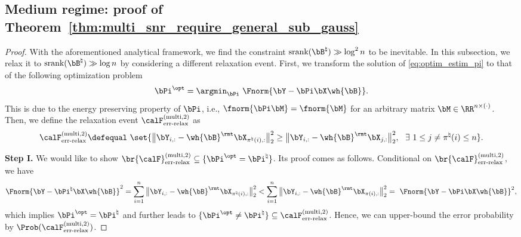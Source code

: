 \documentclass[11pt]{article}
\def \bPitrue {\bPi^{\natural}}
\def \bBtrue {\bB^{\natural}}
\def \bPiopt {\bPi^{\opt}}
\def\srank#1{\textup{srank}(#1)}
\begin{document}
\subsection{Medium regime: proof of Theorem~\ref{thm:multi_snr_require_general_sub_gauss}}

\begin{proof}
With the aforementioned analytical framework, we find the
constraint $\srank{\bBtrue} \gg \log^2 n$ to be inevitable.
In this subsection, we relax it to $\srank{\bBtrue} \gg \log n$ by
considering a different relaxation event.
First, we transform the solution of \eqref{eq:optim_estim_pi} to
that of the following optimization problem
\[
\bPiopt = \argmin_{\bPi}~\Fnorm{\bY - \bPi\bX \wh{\bB} }.
\]
This is due to the energy preserving property
of $\bPi$, i.e., $\fnorm{\bPi \bM} = \fnorm{\bM}$ for
an arbitrary matrix $\bM \in \RR^{n\times (\cdot)}$.
Then, we define the relaxation event $\calF_{\textup{err-relax}}^{(\textup{multi}, 2)}$ as
\[
\calF_{\textup{err-relax}}^{(\textup{multi}, 2)} \defequal \
\set{\big\|\bY_{i, :} - \wh{\bB}^{\rmt}\bX_{\pi^{\natural}(i), :} \big\|_{2}^2 \geq \big\|\bY_{i, :} - \wh{\bB}^{\rmt}\bX_{j, :} \big\|_{2}^2,~~\exists~1\leq j\neq \pi^{\natural}(i) \leq n}.
\]

\noindent
\textbf{Step I.}
We would like to show $\br{\calF}_{\textup{err-relax}}^{(\textup{multi}, 2)} \subseteq \{\bPiopt = \bPitrue\}$. Its proof comes as follows.
Conditional on $\br{\calF}_{\textup{err-relax}}^{(\textup{multi}, 2)}$, we have
\[
\Fnorm{\bY - \bPitrue\bX\wh{\bB} }^2 =
\sum_{i=1}^n \big \|\bY_{i, :} - \wh{\bB}^{\rmt}\bX_{\pi^{\natural}(i), :}\big \|_{2}^2
< \sum_{i=1}^n \big \|\bY_{i, :} -\wh{\bB}^{\rmt} \bX_{\pi(i), :}\big \|_{2}^2 = \
\Fnorm{\bY - \bPi\bX\wh{\bB} }^2,
\]
which implies $\bPiopt = \bPitrue$ and further leads to
$\{\bPiopt \neq \bPitrue\} \subseteq \calF_{\textup{err-relax}}^{(\textup{multi}, 2)}$.
Hence, we can upper-bound the error probability
by $\Prob(\calF_{\textup{err-relax}}^{(\textup{multi}, 2)})$.


\end{proof}
\end{document}
